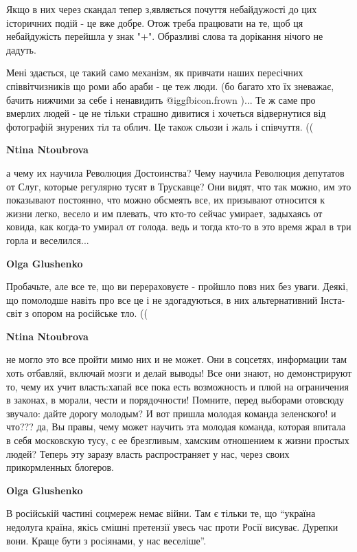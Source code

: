 \begin{itemize}
\begin{itemize}
Якщо в них через скандал тепер з,являється почуття небайдужості до цих
історичних подій - це вже добре. Отож треба працювати на те, щоб ця
небайдужість перейшла у знак "+". Образливі слова та дорікання нічого не
дадуть.

Мені здається, це такий само механізм, як привчати наших пересічних
співвітчизників що роми або араби - це теж люди. (бо багато хто їх зневажає,
бачить нижчими за себе і ненавидить  @igg{fbicon.frown} )... Те ж саме про вмерлих людей - це не
тільки страшно дивитися і хочеться відвернутися від фотографій знурених тіл та
облич. Це також сльози і жаль і співчуття. ((

\textbf{Ntina Ntoubrova} 

а чему их научила Революция Достоинства? Чему научила Революция депутатов от
Слуг, которые регулярно тусят в Трускавце? Они видят, что так можно, им это
показывают постоянно, что можно обсмеять все, их призывают относится к жизни
легко, весело и им плевать, что кто-то сейчас умирает, задыхаясь от ковида, как
когда-то умирал от голода. ведь и тогда кто-то в это время жрал в три горла и
веселился...


\textbf{Olga Glushenko} 

Пробачьте, але все те, що ви перераховуєте - пройшло повз них без уваги. Деякі,
що помолодше навіть про все це і не здогадуються, в них альтернативний
Інста-світ з опором на російське тло. ((

\textbf{Ntina Ntoubrova} 

не могло это все пройти мимо них и не может. Они в соцсетях, информации там хоть
отбавляй, включай мозги и делай выводы! Все они знают, но демонстрируют то, чему
их учит власть:хапай все пока есть возможность и плюй на ограничения в
законах, в морали, чести и порядочности! Помните, перед выборами отовсюду
звучало: дайте дорогу молодым? И вот пришла молодая команда зеленского! и
что??? да, Вы правы, чему может научить эта молодая команда, которая впитала в
себя московскую тусу, с ее брезгливым, хамским отношением к жизни простых людей?
Теперь эту заразу власть распространяет у нас, через своих прикормленных
блогеров.


\textbf{Olga Glushenko} 

В російській частині соцмереж немає війни. Там є тільки те, що \enquote{україна
недолуга країна, якісь смішні претензії увесь час проти Росії висуває. Дурепки
вони. Краще бути з росіянами, у нас веселіше}.


\end{itemize}
\end{itemize}
